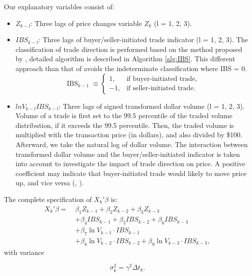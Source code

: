 Our explanatory variables consist of:
\begin{itemize}
    \item $Z_{k-l}$: Three lags of price changes variable $Z_k$ (l = 1, 2, 3).
    \item $IBS_{k-l}$: Three lags of buyer/seller-initiated trade indicator (l = 1, 2, 3). The classification of trade direction is performed based on the method proposed by \citet{leeready1991}, detailed algorithm is described in Algorithm \ref{alg:IBS}. This different approach than that of \citet{hausman1992} avoids the indeterminate classification where IBS = 0.
    \begin{equation}
\mathrm{IBS}_{k-1} \;\equiv
\begin{cases}
1,  & \text{if buyer-initiated trade},\\
-1, & \text{if seller-initiated trade}.
\end{cases}
\label{eq:5}
\end{equation}
    
       \item$lnV_{k-l}IBS_{k-l}$: Three lags of signed transformed dollar volume (l = 1, 2, 3). Volume of a trade is first set to the 99.5 percentile of the traded volume distribution, if it exceeds the 99.5 percentile. Then, the traded volume is multiplied with the transaction price (in dollars), and also divided by \$100. Afterward, we take the natural log of dollar volume. 
       The interaction between transformed dollar volume and the buyer/seller-initiated indicator is taken into account to investigate the impact of trade direction on price. A positive coefficient may indicate that buyer-initiated trade would likely to move price up, and vice versa (\citet{hausman1992}, \citet{easleyohara1987}).
\end{itemize}

The complete specification of \(X_k' \beta\) is:
\begin{align}
X_k' \beta =\ & \beta_1 Z_{k-1} + \beta_2 Z_{k-2} + \beta_3 Z_{k-3} \nonumber \\
& + \beta_4 IBS_{k-1} + \beta_5 IBS_{k-2} + \beta_6 IBS_{k-3} \nonumber \\
& + \beta_7 \ln V_{k-1} \cdot IBS_{k-1} \nonumber \\
& + \beta_8 \ln V_{k-2} \cdot IBS_{k-2} + \beta_9 \ln V_{k-3} \cdot IBS_{k-3}, \label{eq:6}
\end{align}
with variance 

\begin{equation}
\sigma_k^2 = \gamma^2 \Delta t_k.
\label{eq:7}
\end{equation}

